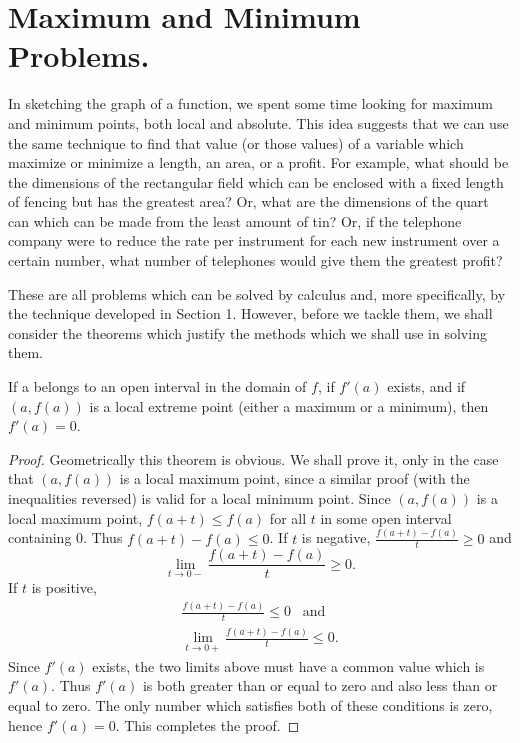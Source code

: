 \section{Maximum and Minimum Problems.}\label{sec 2.2} 
In sketching the graph of a function, we spent some time looking for maximum and minimum points, both local and absolute. This idea suggests that we can use the same technique to find that value (or those values) of a variable which maximize or minimize a length, an area, or a profit. For example, what should be the dimensions of the rectangular field which can be enclosed with a fixed length of fencing but has the greatest area? Or, what are the dimensions of the quart can which can be made from the least amount of tin? Or, if the telephone company were to reduce the rate per instrument for each new instrument over a certain number, what number of telephones would give them the greatest profit?

These are all problems which can be solved by calculus and, more specifically, by the technique developed in Section 1. However, before we tackle them, we shall consider the theorems which justify the methods which we shall use in solving them.

\begin{prop} %
\label{thm 2.2.1}
If a belongs to an open interval in the domain of $f$, if $f'(a)$ exists, and if $(a, f(a))$ is a local extreme point \textrm{(either a maximum or a minimum)}, then $f'(a) = 0$.
\end{prop}

\begin{proof}
Geometrically this theorem is obvious. We shall prove it, only in the case that $(a,f(a))$ is a local maximum point, since a similar proof (with the inequalities reversed) is valid for a local minimum point. Since $(a,f(a))$ is a local maximum point, $f(a + t) \leq f(a)$ for all $t$ in some open interval containing 0. Thus $f(a + t)-f(a) \leq 0$. If $t$ is negative, $\frac{f(a+t) - f(a)}{t} \geq 0$ and 
$$
\lim_{t \rightarrow 0-} \frac{f(a + t) - f(a)}{t} \geq 0.
$$
If $t$ is positive, 
\begin{eqnarray*}
\frac{f(a + t)-f(a)}{t} \leq 0 \;\;\; \mbox{and} \\
\lim_{t \rightarrow 0+} \frac{ f(a + t)-f(a)}{t} \leq 0 .
\end{eqnarray*}
Since $f'(a)$ exists, the two limits above must have a common value which is $f'(a)$.  Thus $f'(a)$ is both greater than or equal to zero and also less than or equal to zero. The only number which satisfies both of these conditions is zero, hence $f'(a) = 0$. This completes the proof.
\end{proof}

